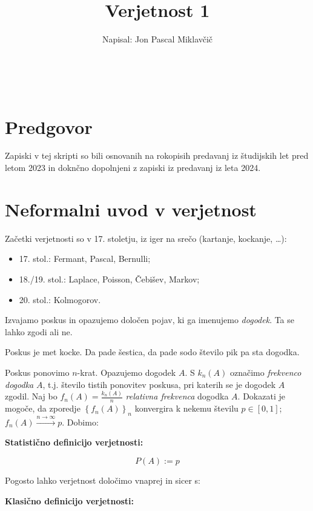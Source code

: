 \documentclass[12pt]{book}
\title{\Huge Verjetnost 1}
\author{Napisal: Jon Pascal Miklavčič}
\date{\filemodprintdate{\jobname}}
\makeatletter
\renewcommand{\maketitle}{
  \begin{titlepage}
    \begin{center}
      \vspace*{25mm} 
      \Huge\@title\par 
      \vspace{20mm} 
      \large\@author \\
      \vspace{140mm} 
      \large\@date\par 
    \end{center}
  \end{titlepage}
}
\def\n{\noindent}
\theoremstyle{definition}
\theoremstyle{plain}
\theoremstyle{plain}
\theoremstyle{plain}
\theoremstyle{remark}
\makeatother
\begin{document}
\frontmatter

\maketitle

\chapter*{Predgovor}
Zapiski v tej skripti so bili osnovanih na rokopisih predavanj iz študijskih let pred letom 2023 in doknčno dopolnjeni z zapiski iz predavanj iz leta 2024.

\tableofcontents

\mainmatter

\chapter{Neformalni uvod v verjetnost}

Začetki verjetnosti so v 17. stoletju, iz iger na srečo (kartanje, kockanje, \dots): 
\begin{itemize}
    \item 17. stol.: Fermant, Pascal, Bernulli;
    \item 18./19. stol.: Laplace, Poisson, Čebišev, Markov;
    \item 20. stol.: Kolmogorov.
\end{itemize}

\n Izvajamo poskus in opazujemo določen pojav, ki ga imenujemo \emph{dogodek}. Ta se lahko zgodi ali ne. 

\begin{zgled}
    Poskus je met kocke. Da pade šestica, da pade sodo število pik pa sta dogodka.
\end{zgled}

\n Poskus ponovimo $n$-krat. Opazujemo dogodek $A$. S $k_n(A)$ označimo \emph{frekvenco dogodka} $A$, t.j. število tistih ponovitev poskusa, pri katerih se je dogodek $A$ zgodil. Naj bo $f_n(A)=\frac{k_n(A)}{n}$ \emph{relativna frekvenca} dogodka $A$. Dokazati je mogoče, da zporedje $\left\{f_n(A)\right\}_n$ konvergira k nekemu številu $p \in [0, 1]$; $f_n(A) \xrightarrow{n \to \infty} p$. Dobimo:

\textbf{Statistično definicijo verjetnosti:}

$$P(A):= p $$

\n Pogosto lahko verjetnost določimo vnaprej in sicer s: 

\textbf{Klasično definicijo verjetnosti:}
\end{document}
